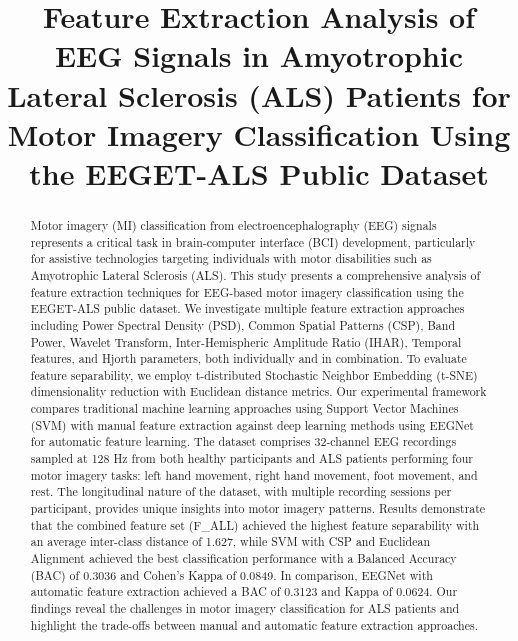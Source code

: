 \documentclass[conference]{IEEEtran}
\begin{document}
\title{Feature Extraction Analysis of EEG Signals in Amyotrophic Lateral Sclerosis (ALS) Patients for Motor Imagery Classification Using the EEGET-ALS Public Dataset}

\author{
}

\maketitle

\begin{abstract}
Motor imagery (MI) classification from electroencephalography (EEG) signals represents a critical task in brain-computer interface (BCI) development, particularly for assistive technologies targeting individuals with motor disabilities such as Amyotrophic Lateral Sclerosis (ALS). This study presents a comprehensive analysis of feature extraction techniques for EEG-based motor imagery classification using the EEGET-ALS public dataset. We investigate multiple feature extraction approaches including Power Spectral Density (PSD), Common Spatial Patterns (CSP), Band Power, Wavelet Transform, Inter-Hemispheric Amplitude Ratio (IHAR), Temporal features, and Hjorth parameters, both individually and in combination. To evaluate feature separability, we employ t-distributed Stochastic Neighbor Embedding (t-SNE) dimensionality reduction with Euclidean distance metrics. Our experimental framework compares traditional machine learning approaches using Support Vector Machines (SVM) with manual feature extraction against deep learning methods using EEGNet for automatic feature learning. The dataset comprises 32-channel EEG recordings sampled at 128 Hz from both healthy participants and ALS patients performing four motor imagery tasks: left hand movement, right hand movement, foot movement, and rest. The longitudinal nature of the dataset, with multiple recording sessions per participant, provides unique insights into motor imagery patterns. Results demonstrate that the combined feature set (F\_ALL) achieved the highest feature separability with an average inter-class distance of 1.627, while SVM with CSP and Euclidean Alignment achieved the best classification performance with a Balanced Accuracy (BAC) of 0.3036 and Cohen's Kappa of 0.0849. In comparison, EEGNet with automatic feature extraction achieved a BAC of 0.3123 and Kappa of 0.0624. Our findings reveal the challenges in motor imagery classification for ALS patients and highlight the trade-offs between manual and automatic feature extraction approaches.
\end{abstract}
\end{document}
